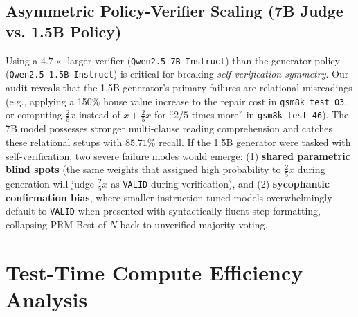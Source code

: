 \documentclass[10pt,a4paper]{article}
\begin{document}
\subsection{Asymmetric Policy-Verifier Scaling (7B Judge vs. 1.5B Policy)}
Using a $4.7\times$ larger verifier (\texttt{Qwen2.5-7B-Instruct}) than the generator policy (\texttt{Qwen2.5-1.5B-Instruct}) is critical for breaking \textit{self-verification symmetry}. Our audit reveals that the 1.5B generator's primary failures are relational misreadings (e.g., applying a 150\% house value increase to the repair cost in \texttt{gsm8k\_test\_03}, or computing $\frac{2}{5}x$ instead of $x + \frac{2}{5}x$ for ``$2/5$ times more'' in \texttt{gsm8k\_test\_46}). The 7B model possesses stronger multi-clause reading comprehension and catches these relational setups with $85.71\%$ recall. If the 1.5B generator were tasked with self-verification, two severe failure modes would emerge: (1) \textbf{shared parametric blind spots} (the same weights that assigned high probability to $\frac{2}{5}x$ during generation will judge $\frac{2}{5}x$ as \texttt{VALID} during verification), and (2) \textbf{sycophantic confirmation bias}, where smaller instruction-tuned models overwhelmingly default to \texttt{VALID} when presented with syntactically fluent step formatting, collapsing PRM Best-of-$N$ back to unverified majority voting.

\section{Test-Time Compute Efficiency Analysis}
\end{document}

